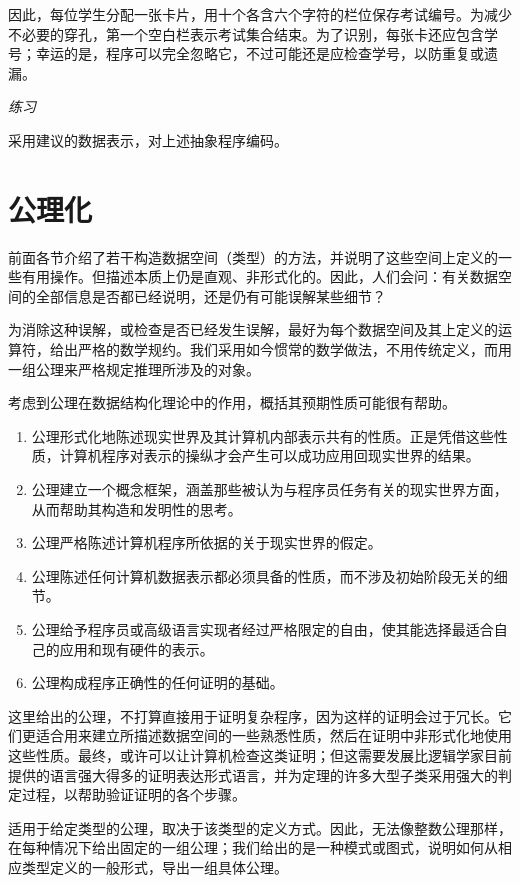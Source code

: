 因此，每位学生分配一张卡片，用十个各含六个字符的栏位保存考试编号。为减少不必要的穿孔，第一个空白栏表示考试集合结束。为了识别，每张卡还应包含学号；幸运的是，程序可以完全忽略它，不过可能还是应检查学号，以防重复或遗漏。

\noindent
\textit{练习}
\nopagebreak

\noindent
采用建议的数据表示，对上述抽象程序编码。
\section{公理化}

前面各节介绍了若干构造数据空间（类型）的方法，并说明了这些空间上定义的一些有用操作。但描述本质上仍是直观、非形式化的。因此，人们会问：有关数据空间的全部信息是否都已经说明，还是仍有可能误解某些细节？

为消除这种误解，或检查是否已经发生误解，最好为每个数据空间及其上定义的运算符，给出严格的数学规约。我们采用如今惯常的数学做法，不用传统定义，而用一组公理来严格规定推理所涉及的对象。

考虑到公理在数据结构化理论中的作用，概括其预期性质可能很有帮助。

\begin{enumerate}[wide, nosep, label=(\arabic*)]
	\item 公理形式化地陈述现实世界及其计算机内部表示共有的性质。正是凭借这些性质，计算机程序对表示的操纵才会产生可以成功应用回现实世界的结果。
	\item 公理建立一个概念框架，涵盖那些被认为与程序员任务有关的现实世界方面，从而帮助其构造和发明性的思考。
	\item 公理严格陈述计算机程序所依据的关于现实世界的假定。
	\item 公理陈述任何计算机数据表示都必须具备的性质，而不涉及初始阶段无关的细节。
	\item 公理给予程序员或高级语言实现者经过严格限定的自由，使其能选择最适合自己的应用和现有硬件的表示。
	\item 公理构成程序正确性的任何证明的基础。
\end{enumerate}

这里给出的公理，不打算直接用于证明复杂程序，因为这样的证明会过于冗长。它们更适合用来建立所描述数据空间的一些熟悉性质，然后在证明中非形式化地使用这些性质。最终，或许可以让计算机检查这类证明；但这需要发展比逻辑学家目前提供的语言强大得多的证明表达形式语言，并为定理的许多大型子类采用强大的判定过程，以帮助验证证明的各个步骤。

适用于给定类型的公理，取决于该类型的定义方式。因此，无法像整数公理那样，在每种情况下给出固定的一组公理；我们给出的是一种模式或图式，说明如何从相应类型定义的一般形式，导出一组具体公理。

